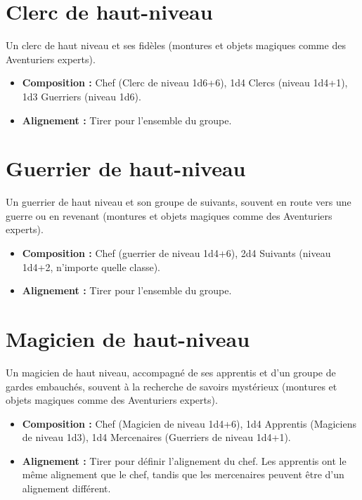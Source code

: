 \section*{Clerc de haut-niveau}\label{clerc-de-haut-niveau}

Un clerc de haut niveau et ses fidèles (montures et objets magiques
comme des Aventuriers experts).

\begin{itemize}
\tightlist
\item
  \textbf{Composition :} Chef (Clerc de niveau 1d6+6), 1d4 Clercs
  (niveau 1d4+1), 1d3 Guerriers (niveau 1d6).
\item
  \textbf{Alignement :} Tirer pour l'ensemble du groupe.
\end{itemize}

\section*{Guerrier de haut-niveau}\label{guerrier-de-haut-niveau}

Un guerrier de haut niveau et son groupe de suivants, souvent en route
vers une guerre ou en revenant (montures et objets magiques comme des
Aventuriers experts).

\begin{itemize}
\tightlist
\item
  \textbf{Composition :} Chef (guerrier de niveau 1d4+6), 2d4 Suivants
  (niveau 1d4+2, n'importe quelle classe).
\item
  \textbf{Alignement :} Tirer pour l'ensemble du groupe.
\end{itemize}

\section*{Magicien de haut-niveau}\label{magicien-de-haut-niveau}

Un magicien de haut niveau, accompagné de ses apprentis et d'un groupe
de gardes embauchés, souvent à la recherche de savoirs mystérieux
(montures et objets magiques comme des Aventuriers experts).

\begin{itemize}
\tightlist
\item
  \textbf{Composition :} Chef (Magicien de niveau 1d4+6), 1d4 Apprentis
  (Magiciens de niveau 1d3), 1d4 Mercenaires (Guerriers de niveau
  1d4+1).
\item
  \textbf{Alignement :} Tirer pour définir l'alignement du chef. Les
  apprentis ont le même alignement que le chef, tandis que les
  mercenaires peuvent être d'un alignement différent.
\end{itemize}

